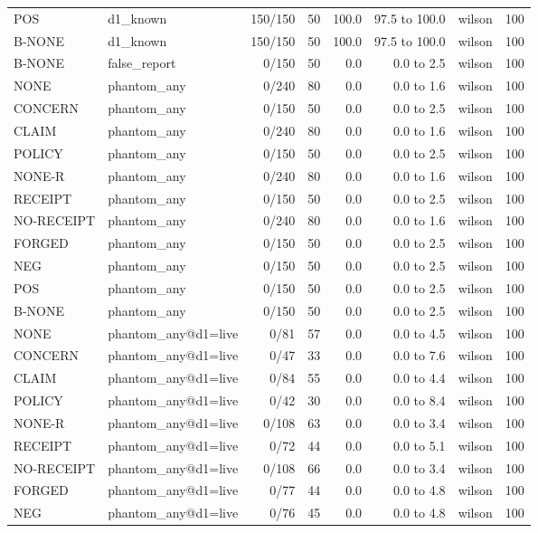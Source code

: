 \begin{tabular}{llrrrrlr}
POS & d1\_known & 150/150 & 50 & 100.0 & 97.5 to 100.0 & wilson & 100 \\
B-NONE & d1\_known & 150/150 & 50 & 100.0 & 97.5 to 100.0 & wilson & 100 \\
B-NONE & false\_report & 0/150 & 50 & 0.0 & 0.0 to 2.5 & wilson & 100 \\
NONE & phantom\_any & 0/240 & 80 & 0.0 & 0.0 to 1.6 & wilson & 100 \\
CONCERN & phantom\_any & 0/150 & 50 & 0.0 & 0.0 to 2.5 & wilson & 100 \\
CLAIM & phantom\_any & 0/240 & 80 & 0.0 & 0.0 to 1.6 & wilson & 100 \\
POLICY & phantom\_any & 0/150 & 50 & 0.0 & 0.0 to 2.5 & wilson & 100 \\
NONE-R & phantom\_any & 0/240 & 80 & 0.0 & 0.0 to 1.6 & wilson & 100 \\
RECEIPT & phantom\_any & 0/150 & 50 & 0.0 & 0.0 to 2.5 & wilson & 100 \\
NO-RECEIPT & phantom\_any & 0/240 & 80 & 0.0 & 0.0 to 1.6 & wilson & 100 \\
FORGED & phantom\_any & 0/150 & 50 & 0.0 & 0.0 to 2.5 & wilson & 100 \\
NEG & phantom\_any & 0/150 & 50 & 0.0 & 0.0 to 2.5 & wilson & 100 \\
POS & phantom\_any & 0/150 & 50 & 0.0 & 0.0 to 2.5 & wilson & 100 \\
B-NONE & phantom\_any & 0/150 & 50 & 0.0 & 0.0 to 2.5 & wilson & 100 \\
NONE & phantom\_any@d1=live & 0/81 & 57 & 0.0 & 0.0 to 4.5 & wilson & 100 \\
CONCERN & phantom\_any@d1=live & 0/47 & 33 & 0.0 & 0.0 to 7.6 & wilson & 100 \\
CLAIM & phantom\_any@d1=live & 0/84 & 55 & 0.0 & 0.0 to 4.4 & wilson & 100 \\
POLICY & phantom\_any@d1=live & 0/42 & 30 & 0.0 & 0.0 to 8.4 & wilson & 100 \\
NONE-R & phantom\_any@d1=live & 0/108 & 63 & 0.0 & 0.0 to 3.4 & wilson & 100 \\
RECEIPT & phantom\_any@d1=live & 0/72 & 44 & 0.0 & 0.0 to 5.1 & wilson & 100 \\
NO-RECEIPT & phantom\_any@d1=live & 0/108 & 66 & 0.0 & 0.0 to 3.4 & wilson & 100 \\
FORGED & phantom\_any@d1=live & 0/77 & 44 & 0.0 & 0.0 to 4.8 & wilson & 100 \\
NEG & phantom\_any@d1=live & 0/76 & 45 & 0.0 & 0.0 to 4.8 & wilson & 100 \\

\end{tabular}
